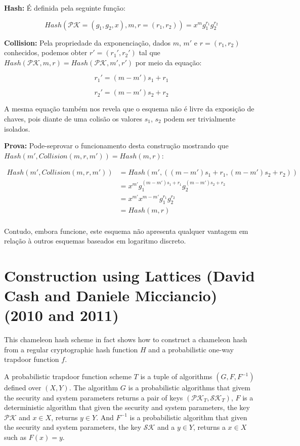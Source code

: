 \documentclass[a4paper]{article}
\begin{document}
 \textbf{Hash: } É definida pela seguinte função:
 
 $$
 Hash(\mathcal{PK}=(g_1, g_2, x), m, r=(r_1, r_2)) = x^mg_1^{r_1}g_2^{r_2}
 $$
 
 \textbf{Collision: } Pela propriedade da exponenciação, dados $m$,
 $m'$ e $r=(r_1, r_2)$ conhecidos, podemos obter $r'=(r_1', r_2')$ tal
 que $Hash(\mathcal{PK}, m, r) = Hash(\mathcal{PK}, m', r')$ por meio
 da equação:
 
 $$
 r_1' = (m-m')s_1+r_1
 $$
 
 $$
 r_2' = (m-m')s_2+r_2
 $$
 
 A mesma equação também nos revela que o esquema não é livre da
 exposição de chaves, pois diante de uma colisão os valores $s_1$,
 $s_2$ podem ser trivialmente isolados.
 
 \textbf{Prova: }Pode-seprovar o funcionamento desta construção
 mostrando que $Hash(m', Collision(m, r, m')) = Hash(m, r)$:
 
 \begin{equation}
 \begin{split}
 Hash(m', Collision(m, r, m'))
 &= Hash(m', ((m-m')s_1+r_1, (m-m')s_2+r_2))\\
 &= x^{m'}g_1^{(m-m')s_1+r_1}g_2^{(m-m')s_2+r_2}\\
 &= x^{m'}x^{m-m'}g_1^{r_1}g_2^{r_2}\\
 &= Hash(m, r)\\
 \end{split}
 \end{equation}
 
 Contudo, embora funcione, este esquema não apresenta qualquer vantagem
 em relação à outros esquemas baseados em logaritmo discreto.
 
 \section{Construction using Lattices (David Cash and Daniele Micciancio)
 (2010 and 2011)\cite{reticulado}\cite{micciancio2012trapdoors}}
 
 This chameleon hash scheme in fact shows how to construct a chameleon hash from a regular cryptographic hash function $H$ and a probabilistic one-way trapdoor function $f$.
 
 A probabilistic trapdoor function scheme $T$ is a tuple of algorithms $(G, F, F^{-1})$ defined over $(X, Y)$. The algorithm $G$ is a probabilistic algorithms that givem the security and system parameters returns a pair of keys $(\mathcal{PK}_T, \mathcal{SK}_T)$, $F$ is a deterministic algorithm that given the security and system parameters, the key $\mathcal{PK}$ and $x \in X$, returns $y \in Y$. And $F^{-1}$ is a probabilistic algorithm that given the security and system parameters, the key $\mathcal{SK}$ and a $y \in Y$, returns a $x \in X$ such as $F(x)=y$.
 
\end{document}
